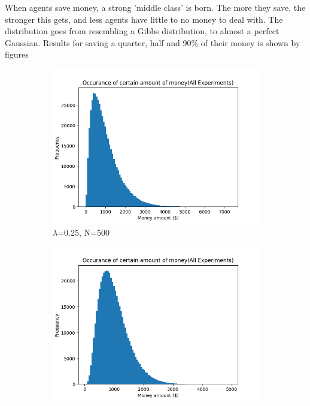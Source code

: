 \documentclass[12pt]{article} %
\begin{document}
When agents save money, a strong 'middle class' is born. The more they save,
the stronger this gets, and less agents have little to no money to deal with.
The distribution goes from resembling a Gibbs distribution, to almost a perfect
Gaussian. Results for saving a quarter, half and 90\% of their money is shown
by figures 
\newcommand{\scaleResultsB}{0.45}
\begin{figure}
	\begin{subfigure}{0.5\textwidth}
		\includegraphics[scale=\scaleResultsB]{sav.25.png}
		\caption{$\lambda$=0.25, N=500}
		\label{fig:sav.25}
	\end{subfigure}
	\begin{subfigure}{0.5\textwidth}
		\includegraphics[scale=\scaleResultsB]{sav.5.png}

\end{subfigure}
\end{figure}
\end{document}
